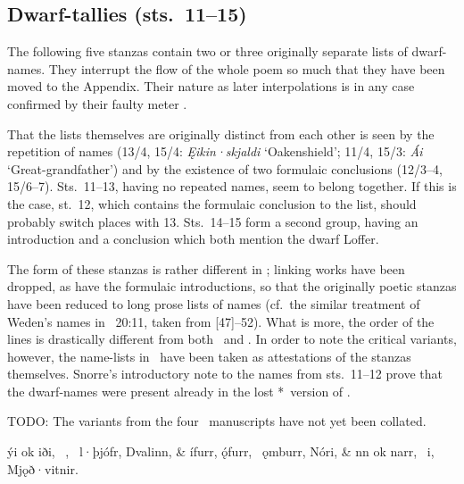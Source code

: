 \subsection{Dwarf-tallies (sts.~11--15)}

The following five stanzas contain two or three originally separate lists of dwarf-names.  They interrupt the flow of the whole poem so much that they have been moved to the Appendix.  Their nature as later interpolations is in any case confirmed by their faulty meter \parencite[373]{Males2025Hlod}.

That the lists themselves are originally distinct from each other is seen by the repetition of names (13/4, 15/4: \emph{Ęikin·skjaldi} ‘Oakenshield’; 11/4, 15/3: \emph{Ái} ‘Great-grandfather’) and by the existence of two formulaic conclusions (12/3--4, 15/6--7).  Sts.~11--13, having no repeated names, seem to belong together.  If this is the case, st.~12, which contains the formulaic conclusion to the list, should probably switch places with 13.
Sts.~14--15 form a second group, having an introduction and a conclusion which both mention the dwarf Loffer.

The form of these stanzas is rather different in \Gylfaginning; linking works have been dropped, as have the formulaic introductions, so that the originally poetic stanzas have been reduced to long prose lists of names (cf.~the similar treatment of Weden’s names in \Gylfaginning~20:11, taken from [47]--52).  What is more, the order of the lines is drastically different from both \Regius\ and \Hauksbok.
In order to note the critical variants, however, the name-lists in \Gylfaginning\ have been taken as attestations of the stanzas themselves.  Snorre’s introductory note to the names from sts.~11--12 prove that the dwarf-names were present already in the lost *\GylfMS\ version of \Voluspa.

TODO: The variants from the four \Gylfaginning\ manuscripts have not yet been collated.

\bvg\bva[11]%
%
ýi ok iði, \hld\ , \hld\ l·þjófr, Dvalinn, &
ífurr, ǫ́furr, \hld\ ǫmburr, Nóri, &
nn ok narr, \hld\ i, Mjǫð·vitnir.\eva

